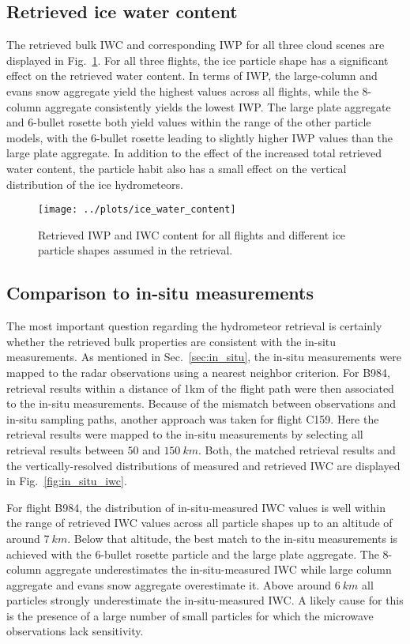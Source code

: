 \documentclass[journal abbreviation, manuscript]{copernicus}
\begin{document}
\subsection{Retrieved ice water content}

The retrieved bulk IWC and corresponding IWP for all three cloud scenes are
displayed in Fig.~\ref{fig:ice_water_content}. For all three flights, the ice
particle shape has a significant effect on the retrieved water content. In terms
of IWP, the large-column and evans snow aggregate yield the highest values
across all flights, while the 8-column aggregate consistently yields the lowest
IWP. The large plate aggregate and 6-bullet rosette both yield values within the
range of the other particle models, with the 6-bullet rosette leading to
slightly higher IWP values than the large plate aggregate. In addition to the
effect of the increased total retrieved water content, the particle habit also
has a small effect on the vertical distribution of the ice hydrometeors.


\begin{figure}[!hbpt]
  \centering
  \texttt{[image: ../plots/ice\_water\_content]}
  \caption{Retrieved IWP and IWC content for all flights and
    different ice particle shapes assumed in the retrieval.}
  \label{fig:ice_water_content}
\end{figure}

\subsection{Comparison to in-situ measurements}

The most important question regarding the hydrometeor retrieval is certainly
whether the retrieved bulk properties are consistent with the in-situ
measurements. As mentioned in Sec.~\ref{sec:in_situ}, the in-situ measurements
were mapped to the radar observations using a nearest neighbor criterion. For
B984, retrieval results within a distance of 1km of the flight path were then
associated to the in-situ measurements. Because of the mismatch between
observations and in-situ sampling paths, another approach was taken for flight
C159. Here the retrieval results were mapped to the in-situ measurements by
selecting all retrieval results between $50$ and $150\ \unit{km}$. Both,
the matched retrieval results and the vertically-resolved distributions of
measured and retrieved IWC are displayed in Fig.~\ref{fig:in_situ_iwc}.

For flight B984, the distribution of in-situ-measured IWC values is well
within the range of retrieved IWC values across all particle shapes up
to an altitude of around $7\ \unit{km}$. Below that altitude, the best
match to the in-situ measurements is achieved with the 6-bullet rosette
particle and the large plate aggregate. The 8-column aggregate underestimates
the in-situ-measured IWC while large column aggregate and evans snow aggregate
overestimate it. Above around $6\ \unit{km}$ all particles strongly
underestimate the in-situ-measured IWC. A likely cause for this is the
presence of a large number of small particles for which the microwave
observations lack sensitivity.
\end{document}
